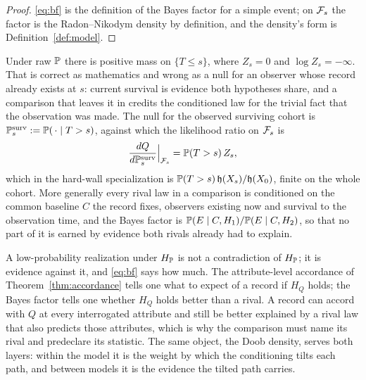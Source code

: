 \begin{proof}
\eqref{eq:bf} is the definition of the Bayes factor for a simple event;
on $\mathcal{F}_s$ the factor is the Radon--Nikodym density by definition, and the
density's form is Definition~\ref{def:model}.
\end{proof}

\begin{remark}\label{rem:survnull}
Under raw $\mathbb{P}$ there is positive mass on $\{T\le s\}$, where
$Z_s=0$ and $\log Z_s=-\infty$. That is correct as mathematics and
wrong as a null for an observer whose record already exists at $s$:
current survival is evidence both hypotheses share, and a comparison
that leaves it in credits the conditioned law for the trivial fact that
the observation was made. The null for the observed surviving cohort is
$\mathbb{P}^{\mathrm{surv}}_s:=\mathbb{P}(\,\cdot\mid T>s)$, against which the
likelihood ratio on $\mathcal{F}_s$ is
\begin{equation}\label{eq:survlr}
\frac{dQ}{d\mathbb{P}^{\mathrm{surv}}_s}\Big|_{\mathcal{F}_s}=\mathbb{P}(T>s)\,Z_s,
\end{equation}
which in the hard-wall specialization is $\mathbb{P}(T>s)\,\mathfrak{h}(X_s)/\mathfrak{h}(X_0)$,
finite on the whole cohort. More generally every rival law in a
comparison is conditioned on the common baseline $C$ the record fixes,
observers existing now and survival to the observation time, and the
Bayes factor is $\mathbb{P}(E\mid C,H_1)/\mathbb{P}(E\mid C,H_2)$, so that no part of
it is earned by evidence both rivals already had to explain.
\end{remark}

\begin{remark}
\label{rem:whybf}
A low-probability realization under $H_{\mathbb{P}}$ is not a contradiction of
$H_{\mathbb{P}}$; it is evidence against it, and \eqref{eq:bf} says how much. The
attribute-level accordance of Theorem~\ref{thm:accordance} tells one what
to expect of a record if $H_Q$ holds; the Bayes factor tells one whether
$H_Q$ holds better than a rival. A record can accord with $Q$ at every
interrogated attribute and still be better explained by a rival law that
also predicts those attributes, which is why the comparison must name its
rival and predeclare its statistic. The same object, the Doob density,
serves both layers: within the model it is the weight by which the
conditioning tilts each path, and between models it is the evidence the
tilted path carries.
\end{remark}

